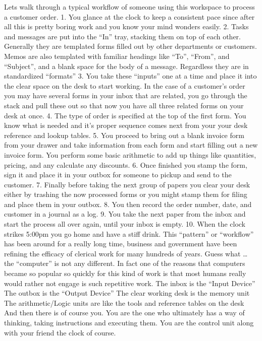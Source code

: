 Lets walk through a typical workflow of someone using this workspace to process a customer order.
    1. You glance at the clock to keep a consistent pace since after all this is pretty boring work and you know your mind wonders easily.
    2. Tasks and messages are put into the “In” tray, stacking them on top of each other. Generally they are templated forms filled out by other departments or customers. Memos are also templated with familiar headings like “To”, “From”, and “Subject”, and a blank space for the body of a message. Regardless they are in standardized “formats”
    3. You take these “inputs” one at a time and place it into the clear space on the desk to start working. In the case of a customer’s order you may have several forms in your inbox that are related, you go through the stack and pull these out so that now you have all three related forms on your desk at once.
    4. The type of order is specified at the top of the first form. You know what is needed and it’s proper sequence comes next from your your desk reference and lookup tables.
    5. You proceed to bring out a blank invoice form from your drawer and take information from each form and start filling out a new invoice form. You perform some basic arithmetic to add up things like quantities, pricing, and any calculate any discounts. 
    6. Once finished you stamp the form, sign it and place it in your outbox for someone to pickup and send to the customer.
    7. Finally before taking the next group of papers you clear your desk either by trashing the now processed forms or you might stamp them for filing and place them in your outbox. 
    8. You then record the order number, date, and customer in a journal as a log. 
    9. You take the next paper from the inbox and start the process all over again, until your inbox is empty.
    10.  When the clock strikes 5:00pm you go home and have a stiff drink. 
This “pattern” or “workflow” has been around for a really long time, business and government have been refining the efficacy of clerical work for many hundreds of years. Guess what … the “computer” is not any different. In fact one of the reasons that computers became so popular so quickly for this kind of work is that most humans really would rather not engage is such repetitive work. 
The inbox is the “Input Device”
The outbox is the “Output Device”
The clear working desk is the memory unit
The arithmetic/Logic units are like the tools and reference tables on the desk
And then there is of course you. You are the one who ultimately has a way of thinking, taking instructions and executing them. You are the control unit along with your friend the clock of course.

